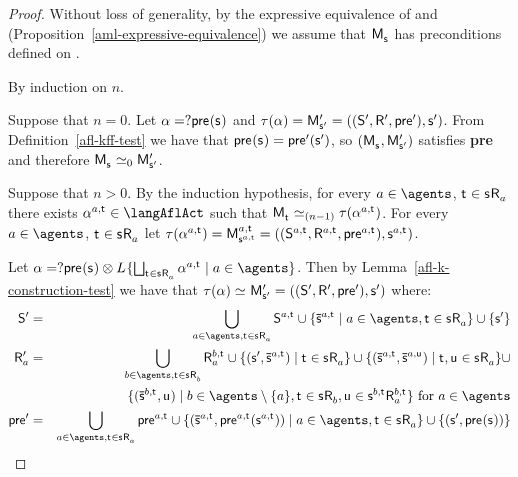\begin{proof}
Without loss of generality, by the expressive equivalence of \logicAmlKFF{} and \logicKFF{} (Proposition~\ref{aml-expressive-equivalence}) we assume that $\aPModel{\aStateS}$ has preconditions defined on \langMl{}.

By induction on $n$.

Suppose that $n = 0$. 
Let $\alpha = \test{\aPrecondition(\aStateS)}$ and $\tau(\alpha) = \aPModelP{\aStateSP} = \aPModelTupleP{\aStateSP}$.
From Definition~\ref{afl-kff-test} we have that $\aPrecondition(\aStateS) = \aPreconditionP(\aStateSP)$, so $(\aPModel{\aStateS}, \aPModelP{\aStateSP})$ satisfies {\bf pre} and therefore $\aPModel{\aStateS} \bisimilar[0] \aPModelP{\aStateSP}$.

Suppose that $n > 0$. 
By the induction hypothesis, for every $\agentA \in \agents$, $\aStateT \in \aStateS \aAccessibility{\agentA}$ there exists $\alpha^{\agentA,\aStateT} \in \langAflAct$ such that $\aPModel{\aStateT} \bisimilar[(n - 1)] \tau(\alpha^{\agentA,\aStateT})$.
For every $\agentA \in \agents$, $\aStateT \in \aStateS \aAccessibility{\agentA}$ let $\tau(\alpha^{\agentA,\aStateT}) = \aPModel[\agentA,\aStateT]{\aStateS[\agentA,\aStateT]} = \aPModelTuple[\agentA,\aStateT]{\aStateS[\agentA,\aStateT]}$.

Let $\alpha = \test{\aPrecondition(\aStateS)} \compose \learns \{\bigchoice_{\aStateT \in \aStateS \aAccessibility{\agentA}} \alpha^{\agentA,\aStateT} \mid \agentA \in \agents\}$. 
Then by Lemma~\ref{afl-k-construction-test} we have that $\tau(\alpha) \bisimilar \aPModelP{\aStateSP} = \aPModelTupleP{\aStateSP}$ where:
\begin{eqnarray*}
    \aStatesP &=& \bigcup_{\agentA \in \agents, \aStateT \in \aStateS \aAccessibility{\agentA}} \aStates[\agentA,\aStateT] \cup \{\aPStateS[\agentA,\aStateT] \mid \agentA \in \agents, \aStateT \in \aStateS \aAccessibility{\agentA}\} \cup \{\aStateSP\}\\
    \aAccessibilityP{\agentA} &=& \bigcup_{\agentB \in \agents, \aStateT \in \aStateS \aAccessibility{\agentB}} \aAccessibility[\agentB,\aStateT]{\agentA} \cup \{(\aStateSP, \aPStateS[\agentA, \aStateT]) \mid \aStateT \in \aStateS \aAccessibility{\agentA}\} \cup \{(\aPStateS[\agentA, \aStateT], \aPStateS[\agentA, \aStateU]) \mid \aStateT, \aStateU \in \aStateS \aAccessibility{\agentA}\} \cup\\
                                               &&\hspace{45pt}\{(\aPStateS[\agentB, \aStateT], \aStateU) \mid \agentB \in \agents \setminus \{\agentA\}, \aStateT \in \aStateS \aAccessibility{\agentB}, \aStateU \in \aStateS[\agentB,\aStateT] \aAccessibility[\agentB,\aStateT]{\agentA}\} \text{ for } \agentA \in \agents\\
    \aPreconditionP &=& \bigcup_{\agentA \in \agents, \aStateT \in \aStateS \aAccessibility{\agentA}} \aPrecondition[\agentA,\aStateT] \cup \{(\aPStateS[\agentA, \aStateT], \aPrecondition[\agentA,\aStateT](\aStateS[\agentA,\aStateT])) \mid \agentA \in \agents, \aStateT \in \aStateS \aAccessibility{\agentA}\} \cup \{(\aStateSP, \aPrecondition(\aStateS))\}
\end{eqnarray*}


\end{proof}
